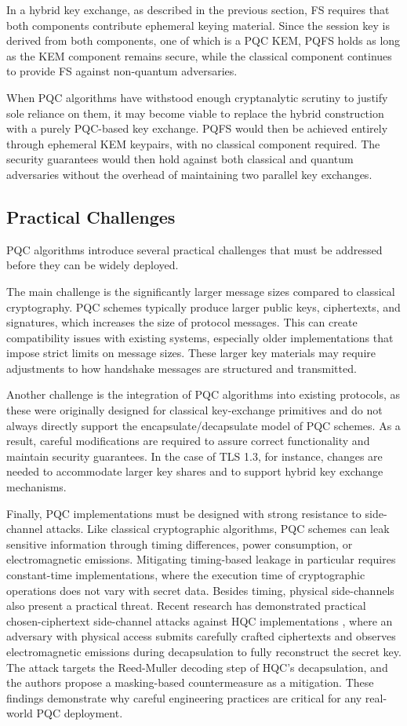 In a hybrid key exchange, as described in the previous section, FS requires that both components contribute ephemeral keying material. Since the session key is derived from both components, one of which is a PQC KEM, PQFS holds as long as the KEM component remains secure, while the classical component continues to provide FS against non-quantum adversaries.

When PQC algorithms have withstood enough cryptanalytic scrutiny to justify sole reliance on them, it may become viable to replace the hybrid construction with a purely PQC-based key exchange. PQFS would then be achieved entirely through ephemeral KEM keypairs, with no classical component required. The security guarantees would then hold against both classical and quantum adversaries without the overhead of maintaining two parallel key exchanges.

\subsection{Practical Challenges}
PQC algorithms introduce several practical challenges that must be addressed before they can be widely deployed.

The main challenge is the significantly larger message sizes compared to classical cryptography. PQC schemes typically produce larger public keys, ciphertexts, and signatures, which increases the size of protocol messages. This can create compatibility issues with existing systems, especially older implementations that impose strict limits on message sizes. These larger key materials may require adjustments to how handshake messages are structured and transmitted.

Another challenge is the integration of PQC algorithms into existing protocols, as these were originally designed for classical key-exchange primitives and do not always directly support the encapsulate/decapsulate model of PQC schemes. As a result, careful modifications are required to assure correct functionality and maintain security guarantees. In the case of TLS 1.3, for instance, changes are needed to accommodate larger key shares and to support hybrid key exchange mechanisms.

Finally, PQC implementations must be designed with strong resistance to side-channel attacks. Like classical cryptographic algorithms, PQC schemes can leak sensitive information through timing differences, power consumption, or electromagnetic emissions. Mitigating timing-based leakage in particular requires constant-time implementations, where the execution time of cryptographic operations does not vary with secret data. Besides timing, physical side-channels also present a practical threat. Recent research has demonstrated practical chosen-ciphertext side-channel attacks against HQC implementations \cite{Goy2022HQCSideChannel}, where an adversary with physical access submits carefully crafted ciphertexts and observes electromagnetic emissions during decapsulation to fully reconstruct the secret key. The attack targets the Reed-Muller decoding step of HQC's decapsulation, and the authors propose a masking-based countermeasure as a mitigation. These findings demonstrate why careful engineering practices are critical for any real-world PQC deployment.